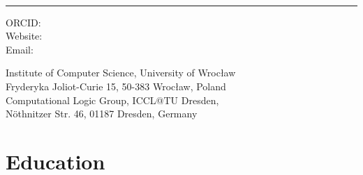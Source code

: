 \documentclass[10pt,a4paper]{article}
\begin{document}
\begin{minipage}[t]{0.5\textwidth}
  {\fontsize{20pt}{0}\selectfont\MyName}
\end{minipage}
\begin{minipage}[t]{0.5\textwidth}
  \begin{flushright}
    \Title{}
  \end{flushright}
\end{minipage}
\\[-0.1cm]
\textcolor{lightgray}{\rule{\textwidth}{3pt}}
\begin{minipage}[t]{0.5\textwidth}
  ORCID: \href{https://orcid.org/\ORCID}{\ORCID}
  \\
  Website: \Website{\PersonalWebsite}
  \\
  Email: \href{mailto:\Email}{\Email}
\end{minipage}
\begin{minipage}[t]{0.5\textwidth}
  \begin{flushright}
  Institute of Computer Science, University of Wrocław 
  \\
  Fryderyka Joliot-Curie 15, 50-383 Wrocław, Poland
  \\
  Computational Logic Group, ICCL@TU Dresden,
  \\
  Nöthnitzer Str. 46, 01187 Dresden, Germany 
  \end{flushright}
\end{minipage}
\vspace{0.3cm}


\section{Education}
\end{document}
